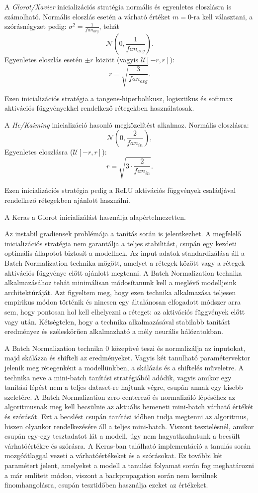 A \textit{Glorot/Xavier} inicializációs stratégia normális és egyenletes eloszlásra is számolható.
Normális eloszlás esetén a várható értéket $m = 0$-ra kell választani, a szórásnégyzet pedig: $ \sigma^2 = \frac{1}{fan_{avg}} $, tehát
$$ \mathcal{N}\left(0, \frac{1}{fan_{avg}}\right). $$
Egyenletes eloszlás esetén $\pm r$ között (vagyis $ \mathcal{U}\left[-r, r\right] $):
$$r = \sqrt{\frac{3}{fan_{avg}}}.$$

Ezen inicializációs stratégia a tangens-hiperbolikusz, logisztikus és softmax aktivációs függvényekkel rendelkező rétegekben használatosak. 

A \textit{He/Kaiming} inicializáció hasonló megközelítést alkalmaz.
Normális eloszlásra:
$$ \mathcal{N}\left(0, \frac{2}{fan_{in}}\right), $$
Egyenletes eloszlásra ($ \mathcal{U}\left[-r, r\right] $):
$$r = \sqrt{3 \cdot \frac{2}{fan_{in}}}.$$

Ezen inicializációs stratégia pedig a ReLU aktivációs függvények családjával rendelkező rétegekben ajánlott használni.

A Keras a Glorot inicializálást használja alapértelmezetten.


Az instabil gradiensek problémája a tanítás során is jelentkezhet. A megfelelő inicializációs stratégia nem garantálja a teljes stabilitást, csupán egy kezdeti optimális állapotot biztosít a modellnek.
Az input adatok standardizálása áll a Batch Normalization technika mögött, amelyet a rétegek között vagy a rétegek aktivációs függvénye előtt ajánlott megtenni. A Batch Normalization technika alkalmazásához tehát minimálisan módosítanunk kell a meglévő modelljeink architektúráját. Azt figyeltem meg, hogy ezen technika alkalmazása teljesen empirikus módon történik és nincsen egy általánosan elfogadott módszer arra sem, hogy pontosan hol kell elhelyezni a réteget: az aktivációs függvények előtt vagy után. Kétségtelen, hogy a technika alkalmazásával stabilabb tanítást eredményez és széleskörűen alkalmazható a mély neurális hálózatokban.

A Batch Normalization technika 0 közepűvé teszi és normalizálja az inputokat, majd skálázza és shifteli az eredményeket. Vagyis két tanulható paramétervektor jelenik meg rétegenként a modellünkben, a skálázás és a shiftelés műveletre. A technika neve a mini-batch tanítási stratégiából adódik, vagyis amikor egy tanítási lépést nem a teljes dataset-re hajtunk végre, csupán annak egy kisebb szeletére. A Batch Normalization zero-centerező és normalizáló lépéséhez az algoritmusnak meg kell becsülnie az aktuális bemeneti mini-batch várható értékét és szórását. Ezt a becslést csupán tanítási időben tudja megtenni az algoritmus, hiszen olyankor rendelkezésére áll a teljes mini-batch. Viszont tesztelésnél, amikor csupán egy-egy tesztadatot lát a modell, úgy nem hagyatkozhatunk a becsült várhatóértékre és szórásra. A Keras-ban található implementáció a tanulás során mozgóátlaggal vezeti a várhatóértékeket és a szórásokat. Ez további két paramétert jelent, amelyeket a modell a tanulási folyamat során fog meghatározni a már említett módon, viszont a backpropagation során nem kerülnek finomhangolásra, csupán tesztidőben használja ezeket az értékeket.

